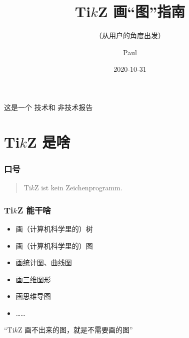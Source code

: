 \documentclass[usenames,xcolor=svgnames,11pt,sans]{beamer}
\newcommand{\key}[1]{{\color{theme} #1}}
\begin{document}
\title{Ti$k$Z 画“图”指南}
\subtitle{（从用户的角度出发）}
\author{Paul}
\date{2020-10-31}



\begin{frame}
    \titlepage
\end{frame}

\begin{frame}
    \begin{center}\Large
        这是一个\key{技术}和\key{非技术}报告
    \end{center}
\end{frame}

\section{Ti$k$Z 是啥}

\begin{frame}
    \frametitle{口号}

    \begin{quote}\Large
        Ti$k$Z ist kein Zeichenprogramm.

    \end{quote}
\end{frame}

\begin{frame}
    \frametitle{Ti$k$Z 能干啥}

    \begin{itemize}
        \item 画（计算机科学里的）树
        \item 画（计算机科学里的）图
        \item 画统计图、曲线图
        \item 画三维图形
        \item 画思维导图
        \item ……
    \end{itemize}

    \pause
    \vspace{20pt}
    \begin{center}\Large\color{theme}
        “Ti$k$Z 画不出来的图，就是不需要画的图”
    \end{center}
\end{frame}
\end{document}
